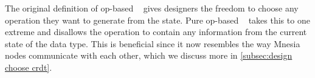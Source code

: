The original definition of op-based ~\cite{shapiro2011CRDT}
gives designers the freedom to choose any operation they want to generate
from the state. Pure op-based ~\cite{baquero2017PureOp,baquero2014PureOp} 
takes this to one extreme and disallows the operation to contain any information
from the current state of the data type. This is beneficial since it now resembles
the way Mnesia nodes communicate with each other, which we discuss more in
\cref{subsec:design choose crdt}.






